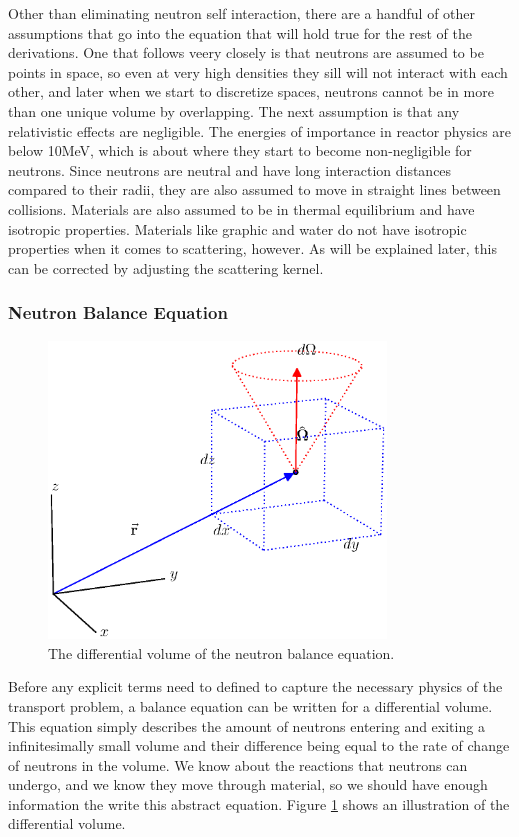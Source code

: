 Other than eliminating neutron self interaction, there are a handful of other assumptions that go into the equation that will hold true for the rest of the derivations.  One that follows veery closely is that neutrons are assumed to be points in space, so even at very high densities they sill will not interact with each other, and later when we start to discretize spaces, neutrons cannot be in more than one unique volume by overlapping.  The next assumption is that any relativistic effects are negligible.  The energies of importance in reactor physics are below 10MeV, which is about where they start to become non-negligible for neutrons.  Since neutrons are neutral and have long interaction distances compared to their radii, they are also assumed to move in straight lines between collisions.  Materials are also assumed to be in thermal equilibrium and have isotropic properties.  Materials like graphic and water do not have isotropic properties when it comes to scattering, however.  As will be explained later, this can be corrected by adjusting the scattering kernel.

\subsubsection{Neutron Balance Equation}

\begin{figure}[h!] 
  \label{diff_volume}
  \centering
    \includegraphics[width=0.8\textwidth,trim= 0cm 2.5cm 0cm 0cm]{graphics/diff_balance.eps} 
     \caption{The differential volume of the neutron balance equation.}
\end{figure}

Before any explicit terms need to defined to capture the necessary physics of the transport problem, a balance equation can be written for a differential volume.  This equation simply describes the amount of neutrons entering and exiting a infinitesimally small volume and their difference being equal to the rate of change of neutrons in the volume.  We know about the reactions that neutrons can undergo, and we know they move through material, so we should have  enough information the write this abstract equation. Figure \ref{diff_volume} shows an illustration of the differential volume.

